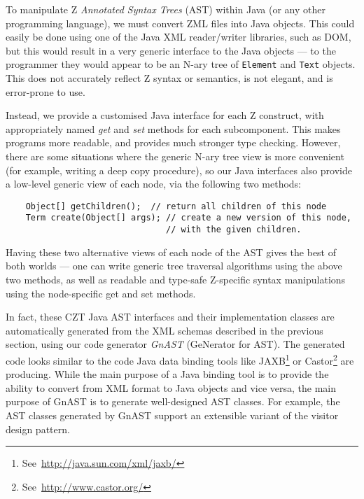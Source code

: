 \documentclass{llncs}
\begin{document}
  To manipulate Z \emph{Annotated Syntax Trees} (AST) within Java (or
  any other programming language), we must convert ZML files into Java
  objects.  This could easily be done using one of the Java XML
  reader/writer libraries, such as DOM, but this would result in a
  very generic interface to the Java objects --- to the programmer they
  would appear to be an N-ary tree of \texttt{Element} and
  \texttt{Text} objects. This does not accurately reflect Z
  syntax or semantics, is not elegant, and is error-prone to use.

  Instead, we provide a customised Java interface for each Z
  construct, with appropriately named \emph{get} and \emph{set}
  methods for each subcomponent.  This makes programs more readable,
  and provides much stronger type checking.  However, there are some
  situations where the generic N-ary tree view is more convenient
  (for example, writing a deep copy procedure), so our Java interfaces
  also provide a low-level generic view of each node, via the following
  two methods:
\begin{small}
\begin{verbatim}
    Object[] getChildren();  // return all children of this node
    Term create(Object[] args); // create a new version of this node,
                                // with the given children.
\end{verbatim}
\end{small}
  Having these two alternative views of each node of the AST gives
  the best of both worlds --- one can write generic tree traversal
  algorithms using the above two methods, as well as readable and 
  type-safe Z-specific syntax manipulations using the node-specific
  get and set methods.

  In fact, these CZT Java AST interfaces and their implementation
  classes are automatically generated from the XML schemas described
  in the previous section, using our code generator \emph{GnAST}
  (GeNerator for AST).  The generated code looks similar to the code
  Java data binding tools like
  JAXB\footnote{See~\url{http://java.sun.com/xml/jaxb/}} or
  Castor\footnote{See~\url{http://www.castor.org/}} are
  producing. While the main purpose of a Java binding tool is to
  provide the ability to convert from XML format to Java objects and
  vice versa, the main purpose of GnAST is to generate well-designed
  AST classes.  For example, the AST classes generated by GnAST
  support an extensible variant of the visitor design pattern.
\end{document}
